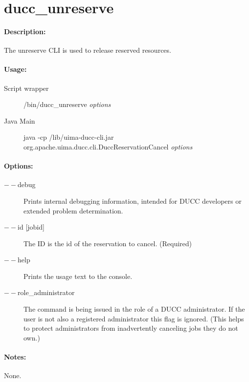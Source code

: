 % 
% 
% 
% 
\ifpdf
\else
{}
\fi
    \section{ducc\_unreserve}
    \label{sec:cli.unreserve}

    \paragraph{Description:}
    The unreserve CLI is used to release reserved resources. 

    \paragraph{Usage:}
    \begin{description}
    \item[Script wrapper] \ducchome/bin/ducc\_unreserve {\em options}
    \item[Java Main]      java -cp \ducchome/lib/uima-ducc-cli.jar org.apache.uima.ducc.cli.DuccReservationCancel {\em options}
    \end{description}

    \paragraph{Options:}
    \begin{description}
        \item[$--$debug ]          
          Prints internal debugging information, intended for DUCC developers or extended problem determination.
        \item[$--$id {[jobid]}]
          The ID is the id of the reservation to cancel. (Required)
        \item[$--$help]
          Prints the usage text to the console. 
        \item[$--$role\_administrator] The command is being issued in the role of a DUCC administrator.
          If the user is not also a registered administrator this flag is ignored.  (This helps to
          protect administrators from inadvertently canceling jobs they do not own.)          
     \end{description}
        
    \paragraph{Notes:}
    None.

